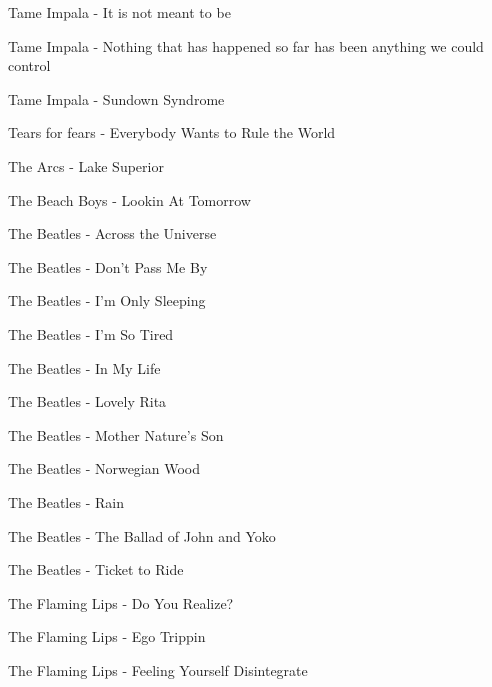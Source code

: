 Tame Impala - It is not meant to be \dotfill \pageref{It is not meant to be - Tame Impala} 

Tame Impala - Nothing that has happened so far has been anything we could control \dotfill \pageref{Nothing that has happened so far has been anything we could control - Tame Impala} 

Tame Impala - Sundown Syndrome \dotfill \pageref{Sundown Syndrome - Tame Impala} 

Tears for fears - Everybody Wants to Rule the World \dotfill \pageref{Everybody Wants to Rule the World - Tears for fears} 

The Arcs - Lake Superior \dotfill \pageref{Lake Superior - The Arcs} 

The Beach Boys - Lookin At Tomorrow \dotfill \pageref{Lookin At Tomorrow - The Beach Boys} 

The Beatles - Across the Universe \dotfill \pageref{Across the Universe - The Beatles} 

The Beatles - Don't Pass Me By \dotfill \pageref{Don't Pass Me By - The Beatles} 

The Beatles - I'm Only Sleeping \dotfill \pageref{I'm Only Sleeping - The Beatles} 

The Beatles - I'm So Tired \dotfill \pageref{I'm So Tired - The Beatles} 

The Beatles - In My Life \dotfill \pageref{In My Life - The Beatles} 

The Beatles - Lovely Rita \dotfill \pageref{Lovely Rita - The Beatles} 

The Beatles - Mother Nature's Son \dotfill \pageref{Mother Nature's Son - The Beatles} 

The Beatles - Norwegian Wood \dotfill \pageref{Norwegian Wood - The Beatles} 

The Beatles - Rain \dotfill \pageref{Rain - The Beatles} 

The Beatles - The Ballad of John and Yoko \dotfill \pageref{The Ballad of John and Yoko - The Beatles} 

The Beatles - Ticket to Ride \dotfill \pageref{Ticket to Ride - The Beatles} 

The Flaming Lips - Do You Realize? \dotfill \pageref{Do You Realize? - The Flaming Lips} 

The Flaming Lips - Ego Trippin \dotfill \pageref{Ego Trippin - The Flaming Lips} 

The Flaming Lips - Feeling Yourself Disintegrate \dotfill \pageref{Feeling Yourself Disintegrate - The Flaming Lips} 

